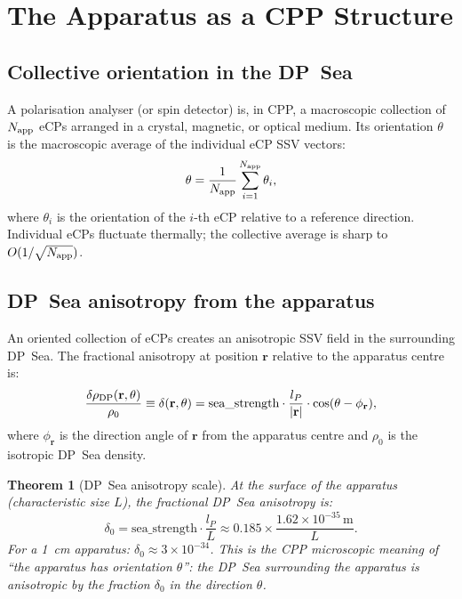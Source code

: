 \documentclass[11pt,letterpaper]{article}
\newtheorem{theorem}{Theorem}[section]
\newcommand{\lP}{l_P}
\begin{document}
\section{The Apparatus as a CPP Structure}
\label{sec:apparatus_cpp}

\subsection{Collective orientation in the DP~Sea}

A polarisation analyser (or spin detector) is, in CPP, a
macroscopic collection of $N_{\rm app}$ eCPs arranged in a
crystal, magnetic, or optical medium.  Its orientation $\theta$
is the macroscopic average of the individual eCP SSV vectors:
\begin{equation}
\theta = \frac{1}{N_{\rm app}}\sum_{i=1}^{N_{\rm app}}\theta_i,
\label{eq:theta_collective}
\end{equation}
where $\theta_i$ is the orientation of the $i$-th eCP relative to
a reference direction.  Individual eCPs fluctuate thermally; the
collective average is sharp to $O(1/\sqrt{N_{\rm app}})$.

\subsection{DP~Sea anisotropy from the apparatus}

An oriented collection of eCPs creates an anisotropic SSV field
in the surrounding DP~Sea.  The fractional anisotropy at position
$\mathbf{r}$ relative to the apparatus centre is:
\begin{equation}
\frac{\delta\rho_{\rm DP}(\mathbf{r},\theta)}{\rho_0}
\equiv \delta(\mathbf{r},\theta)
= \text{sea\_strength} \cdot \frac{\lP}{|\mathbf{r}|}
  \cdot \cos(\theta - \phi_{\mathbf{r}}),
\label{eq:dp_anisotropy}
\end{equation}
where $\phi_{\mathbf{r}}$ is the direction angle of $\mathbf{r}$
from the apparatus centre and $\rho_0$ is the isotropic DP~Sea
density.

\begin{theorem}[DP~Sea anisotropy scale]
\label{thm:anisotropy}
At the surface of the apparatus (characteristic size $L$), the
fractional DP~Sea anisotropy is:
\begin{equation}
\delta_0 = \text{sea\_strength} \cdot \frac{\lP}{L}
\approx 0.185 \times \frac{1.62\times10^{-35}\,\text{m}}{L}.
\label{eq:delta0}
\end{equation}
For a 1~cm apparatus: $\delta_0 \approx 3 \times 10^{-34}$.
This is the CPP microscopic meaning of ``the apparatus has
orientation $\theta$'': the DP~Sea surrounding the apparatus
is anisotropic by the fraction $\delta_0$ in the direction $\theta$.
\end{theorem}
\end{document}

